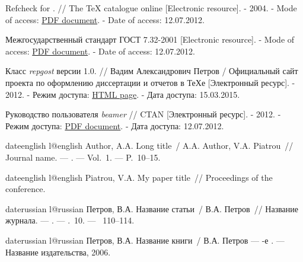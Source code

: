 \begin{thebibliography}{6}
Refcheck for \LaTeXe. //  The \TeX{} catalogue online  [Electronic resource]. - 2004. - Mode of access:
\href{http://www.ctan.org/tex-archive/macros/latex/contrib/refcheck/refdemo.pdf}{PDF document}.  - Date of access: 12.07.2012.

Межгосударственный стандарт ГОСТ 7.32-2001 [Electronic resource]. - Mode of access:
\href{http://txts.mgou.ru/library/stand/20.pdf}{PDF document}.  - Date of access: 12.07.2012.

Класс {\itshape repgost} версии 1.0. // Вадим Александрович Петров / Официальный сайт проекта по оформлению диссертации и отчетов в ТеХе  [Электронный ресурс]. - 2012.
 - Режим доступа: \href{https://github.com/belgraviton/repgost}{HTML page}. - Дата доступа: 15.03.2015.


Руководство пользователя {\itshape beamer} // CTAN  [Электронный ресурс]. - 2012.
 - Режим доступа: \href{http://www.ctan.org/tex-archive/macros/latex/contrib/beamer/doc/beameruserguide.pdf}{PDF document}. - Дата доступа: 12.07.2012.

\end{thebibliography}


% 
% 

\begin{mybibliography}{8}
\def\selectlanguageifdefined#1{
\expandafter\ifx\csname date#1\endcsname\relax
\else\language\csname l@#1\endcsname\fi}

\selectlanguageifdefined{english}
Author, A.A. Long title~/ A.A. Author, V.A. Piatrou~//
  Journal name. ---
. ---
\newblock Vol.~1. ---
\newblock P.~10--15.


\selectlanguageifdefined{english}
Piatrou, V.A. My paper title~// Proceedings of the conference.

\selectlanguageifdefined{russian}
Петров, В.А. Название статьи~/ В.А. Петров~//
  Название журнала. ---
. ---
\newblock \CYRT.~10. ---
~110--114.

\selectlanguageifdefined{russian}
Петров, В.А. Название книги~/ В.А. Петров ---
-е  {\cyr\cyri\cyrz\cyrd.} ---
\newblock Название издательства, 2006.

\end{mybibliography}
